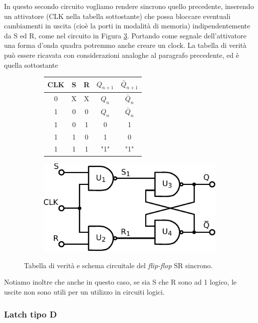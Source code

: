 In questo secondo circuito vogliamo rendere sincrono quello precedente, inserendo un attivatore (CLK nella tabella sottostante) che possa bloccare eventuali cambiamenti in uscita (cioè la porti in modalità di memoria) indipendentemente da S ed R, come nel circuito in Figura \ref{cir11:FF-SR-s}.
Portando come segnale dell'attivatore una forma d'onda quadra potremmo anche creare un clock.
La tabella di verità può essere ricavata con considerazioni analoghe al paragrafo precedente, ed è quella sottostante

\begin{figure}[htpc]
\centering
	\begin{subfigure}[hc]{.4\textwidth}
		\centering
		{\renewcommand{\arraystretch}{1.2}%
		\begin{tabular}{|c||c|c|c|c|}
		\hline
		CLK & S & R & $Q_{n+1}$ & $\bar Q_{n+1}$  \\
		\hline \hline
		0 & X & X & $Q_n$ & $\bar Q_n$\\
		\hline \hline
		 1&0 & 0 & $Q_n$ & $\bar Q_n$\\
		\hline
		1&0 & 1 & 0 &1\\
		\hline
		1&1 & 0 & 1 & 0\\
		\hline
		1&1 & 1 & "1" & "1"\\
		\hline
		\end{tabular}}
		\caption{}
		\label{tab11:FFSR2}
        \end{subfigure}
        \begin{subfigure}[hc]{.4\textwidth}
		\centering
		\includegraphics[width=.7\textwidth]{../E11/latex/FF-SR-sync.pdf}
		\caption{}
		\label{cir11:FF-SR-s}
        \end{subfigure}
\caption{Tabella di verità e schema circuitale del \textit{flip-flop} SR sincrono.}
\end{figure}

Notiamo inoltre che anche in questo caso, se sia S che R sono ad 1 logico, le uscite non sono utili per un utilizzo in circuiti logici.

\subsubsection*{Latch tipo D}

